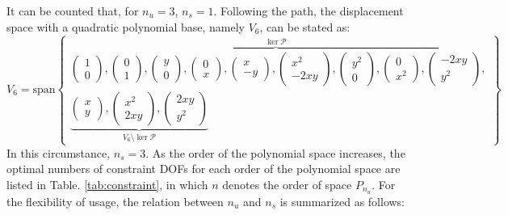 It can be counted that, for $n_u = 3$, $n_s = 1$. Following the path, the displacement space with a quadratic polynomial base, namely $V_6$, can be stated as:
\begin{equation}\label{base2}
V_6 = \mathrm{span}
\begin{Bmatrix}
\overbrace{
\begin{pmatrix} 1 \\ 0 \end{pmatrix},
\begin{pmatrix} 0 \\ 1 \end{pmatrix},
\begin{pmatrix} y \\ 0 \end{pmatrix},
\begin{pmatrix} 0 \\ x \end{pmatrix},
\begin{pmatrix} x \\ -y \end{pmatrix},
\begin{pmatrix} x^2 \\ -2xy \end{pmatrix},
\begin{pmatrix} y^2 \\ 0 \end{pmatrix},
\begin{pmatrix} 0 \\ x^2 \end{pmatrix},
\begin{pmatrix} -2xy \\ y^2 \end{pmatrix}
}^{\ker \mathcal{P}}, \\
\underbrace{
\begin{pmatrix} x \\ y \end{pmatrix},
\begin{pmatrix} x^2 \\ 2xy \end{pmatrix},
\begin{pmatrix} 2xy \\ y^2 \end{pmatrix}
}_{V_6 \setminus \ker \mathcal{P}}
\end{Bmatrix}
\end{equation}
In this circumstance, $n_s = 3$. As the order of the polynomial space increases, the optimal numbers of constraint DOFs for each order of the polynomial space are listed in Table. \ref{tab:constraint}, in which $n$ denotes the order of space $P_{n_u}$. For the flexibility of usage, the relation between $n_u$ and $n_s$ is summarized as follows:

